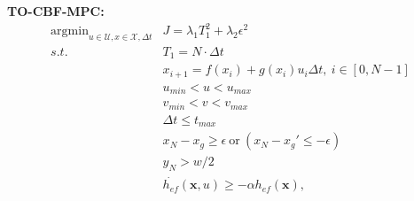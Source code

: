 \documentclass[12pt]{article}
\begin{document}
\begin{boxD}

{\large\textbf{TO-CBF-MPC:}}
\begin{subequations}
    \begin{align}
        \mathop{\arg\min}_{u\in\mathcal{U},x\in\mathcal{X},\Delta t}& J = \lambda_1 T_1^2 + \lambda_2 \epsilon^2\\
         s.t.~ & T_1 = N\cdot \Delta t\\
         & x_{i+1} = f(x_i) + g(x_i)u_i\Delta t,~ i\in [0,N-1]\\
         & u_{min}<u<u_{max}\label{eq.time1_u}\\
         & v_{min}<v<v_{max}\label{eq.time1_v}\\
         & \Delta t\leq t_{max}\label{eq.time1_t}\\
         & x_N-x_g\geq \epsilon ~\text{or}~ (x_N-x_g' \leq -\epsilon)\label{eq.time1_goal}\\
         & y_N > w/2\label{eq.time1_y}\\
         & \dot{h_{ef}}(\mathbf{x},u)\geq -\alpha h_{ef}(\mathbf{x}),\label{eq.time1_cbf}
    \end{align}
    \label{eq.time1}
\end{subequations}
\end{boxD}
\end{document}
